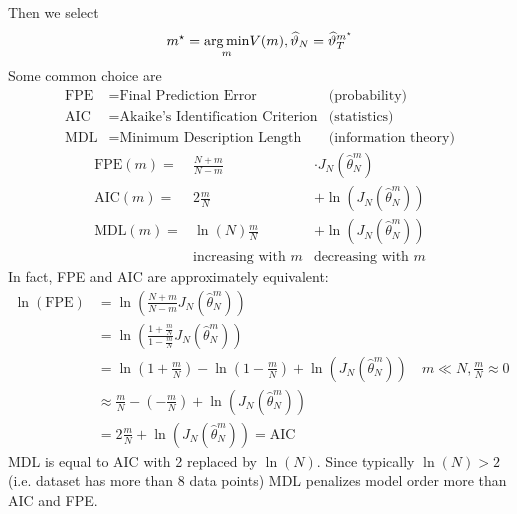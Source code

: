 Then we select
\begin{equation*}
m^{\star} =\underset{m}{\operatorname*{arg\,min}} V(m) ,\widehat{\vartheta }_{N} =\widehat{\vartheta }_{T}^{m^{\star}}
\end{equation*}
Some common choice are
\begin{align*}
\text{FPE} & =\text{Final Prediction Error} & \text{(probability)}\\
\text{AIC} & =\text{Akaike's Identification Criterion} & \text{(statistics)}\\
\text{MDL} & =\text{Minimum Description Length} & \text{(information theory)}
\end{align*}
\begin{equation*}
	\begin{array}{rcc}
		\text{FPE}(m) = & \frac{N+m}{N-m}          &  \cdot J_{N}(\hat{\theta }_{N}^{m})\\
		\text{AIC}(m) = & 2\frac{m}{N}             &  +\ln(J_{N}(\hat{\theta }_{N}^{m}))\\
		\text{MDL}(m) = & \ln(N)\frac{m}{N}        &  +\ln(J_{N}(\hat{\theta }_{N}^{m}))\\
		                & \text{increasing with }m &  \text{decreasing with }m
	\end{array}
\end{equation*}
In fact, FPE and AIC are approximately equivalent:
\begin{align*}
\ln(\text{FPE}) & =\ln\left(\frac{N+m}{N-m} J_{N}(\hat{\theta }_{N}^{m})\right) \\
 & =\ln\left(\frac{1+\frac{m}{N}}{1-\frac{m}{N}} J_{N}(\hat{\theta }_{N}^{m})\right) \\
 & =\ln\left(1+\frac{m}{N}\right) -\ln\left(1-\frac{m}{N}\right) +\ln(J_{N}(\hat{\theta }_{N}^{m})) \quad m\ll N, \frac{m}{N} \approx 0\\
 & \approx \frac{m}{N} -\left(-\frac{m}{N}\right) +\ln(J_{N}(\hat{\theta }_{N}^{m})) \\
 & =2\frac{m}{N} +\ln(J_{N}(\hat{\theta }_{N}^{m})) = \text{AIC} & 
\end{align*}
MDL is equal to AIC with 2 replaced by $ \ln(N)$. Since typically $ \ln(N)  >2$ (i.e. dataset has more than 8 data points) MDL penalizes model order more than AIC and FPE.
